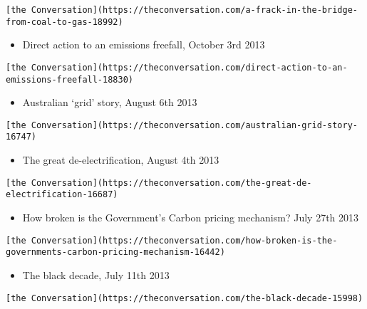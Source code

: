 \documentclass[
]{article}
\providecommand{\tightlist}{%
  \setlength{\itemsep}{0pt}\setlength{\parskip}{0pt}}
\begin{document}
\begin{verbatim}
[the Conversation](https://theconversation.com/a-frack-in-the-bridge-from-coal-to-gas-18992)
\end{verbatim}

\begin{itemize}
\tightlist
\item
  Direct action to an emissions freefall, October 3rd 2013
\end{itemize}

\begin{verbatim}
[the Conversation](https://theconversation.com/direct-action-to-an-emissions-freefall-18830)
\end{verbatim}

\begin{itemize}
\tightlist
\item
  Australian `grid' story, August 6th 2013
\end{itemize}

\begin{verbatim}
[the Conversation](https://theconversation.com/australian-grid-story-16747)
\end{verbatim}

\begin{itemize}
\tightlist
\item
  The great de-electrification, August 4th 2013
\end{itemize}

\begin{verbatim}
[the Conversation](https://theconversation.com/the-great-de-electrification-16687)
\end{verbatim}

\begin{itemize}
\tightlist
\item
  How broken is the Government's Carbon pricing mechanism? July 27th
  2013
\end{itemize}

\begin{verbatim}
[the Conversation](https://theconversation.com/how-broken-is-the-governments-carbon-pricing-mechanism-16442)
\end{verbatim}

\begin{itemize}
\tightlist
\item
  The black decade, July 11th 2013
\end{itemize}

\begin{verbatim}
[the Conversation](https://theconversation.com/the-black-decade-15998)
\end{verbatim}
\end{document}
